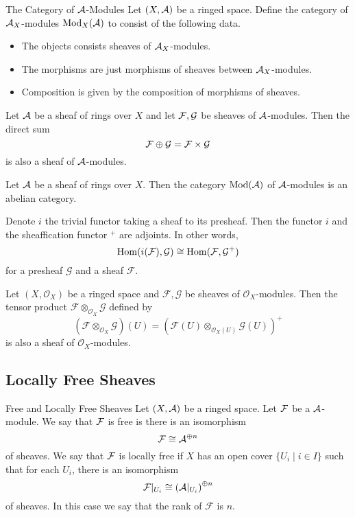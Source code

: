 \documentclass[a4paper]{article}
\begin{document}
\begin{defn}{The Category of $\mathcal{A}$-Modules}{} Let $(X,\mathcal{A})$ be a ringed space. Define the category of $\mathcal{A}_X$-modules $\text{Mod}_X(\mathcal{A})$ to consist of the following data. 
\begin{itemize}
\item The objects consists sheaves of $\mathcal{A}_X$-modules. 
\item The morphisms are just morphisms of sheaves between $\mathcal{A}_X$-modules. 
\item Composition is given by the composition of morphisms of sheaves. 
\end{itemize}
\end{defn}

\begin{prp}{}{} Let $\mathcal{A}$ be a sheaf of rings over $X$ and let $\mathcal{F},\mathcal{G}$ be sheaves of $\mathcal{A}$-modules. Then the direct sum $$\mathcal{F}\oplus\mathcal{G}=\mathcal{F}\times\mathcal{G}$$ is also a sheaf of $\mathcal{A}$-modules. 
\end{prp}

\begin{thm}{}{} Let $\mathcal{A}$ be a sheaf of rings over $X$. Then the category $\text{Mod}(\mathcal{A})$ of $\mathcal{A}$-modules is an abelian category. 
\end{thm}

\begin{prp}{}{} Denote $i$ the trivial functor taking a sheaf to its presheaf. Then the functor $i$ and the sheaffication functor $^+$ are adjoints. In other words, $$\operatorname{Hom}(i(\mathcal{F}),\mathcal{G})\cong\operatorname{Hom}(\mathcal{F},\mathcal{G}^+)$$ for a presheaf $\mathcal{G}$ and a sheaf $\mathcal{F}$. 
\end{prp}

\begin{prp}{}{} Let $(X,\mathcal{O}_X)$ be a ringed space and $\mathcal{F},\mathcal{G}$ be sheaves of $\mathcal{O}_X$-modules. Then the tensor product $\mathcal{F}\otimes_{\mathcal{O}_X}\mathcal{G}$ defined by $$(\mathcal{F}\otimes_{\mathcal{O}_X}\mathcal{G})(U)=(\mathcal{F}(U)\otimes_{\mathcal{O}_X(U)}\mathcal{G}(U))^+$$ is also a sheaf of $\mathcal{O}_X$-modules. 
\end{prp}

\subsection{Locally Free Sheaves}
\begin{defn}{Free and Locally Free Sheaves}{} Let $(X,\mathcal{A})$ be a ringed space. Let $\mathcal{F}$ be a $\mathcal{A}$-module. We say that $\mathcal{F}$ is free is there is an isomorphism $$\mathcal{F}\cong\mathcal{A}^{\oplus n}$$ of sheaves. We say that $\mathcal{F}$ is locally free if $X$ has an open cover $\{U_i\;|\;i\in I\}$ such that for each $U_i$, there is an isomorphism $$\mathcal{F}|_{U_i}\cong\left(\mathcal{A}|_{U_i}\right)^{\oplus n}$$ of sheaves. In this case we say that the rank of $\mathcal{F}$ is $n$. 
\end{defn}
\end{document}
